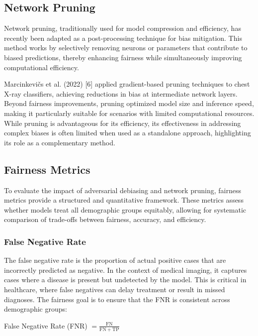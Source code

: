 \documentclass[11pt]{article}
\begin{document}
\subsection{Network Pruning}

Network pruning, traditionally used for model compression and efficiency, has recently been adapted as a post-processing technique for bias mitigation. This method works by selectively removing neurons or parameters that contribute to biased predictions, thereby enhancing fairness while simultaneously improving computational efficiency.

Marcinkevi\v{c}s et al. (2022) [6] applied gradient-based pruning techniques to chest X-ray classifiers, achieving reductions in bias at intermediate network layers. Beyond fairness improvements, pruning optimized model size and inference speed, making it particularly suitable for scenarios with limited computational resources. While pruning is advantageous for its efficiency, its effectiveness in addressing complex biases is often limited when used as a standalone approach, highlighting its role as a complementary method.

\subsection{Fairness Metrics}

To evaluate the impact of adversarial debiasing and network pruning, fairness metrics provide a structured and quantitative framework. These metrics assess whether models treat all demographic groups equitably, allowing for systematic comparison of trade-offs between fairness, accuracy, and efficiency.

\subsubsection{False Negative Rate}

The false negative rate is the proportion of actual positive cases that are incorrectly predicted as negative. In the context of medical imaging, it captures cases where a disease is present but undetected by the model. This is critical in healthcare, where false negatives can delay treatment or result in missed diagnoses. The fairness goal is to ensure that the FNR is consistent across demographic groups:

\medskip
\noindent\hfill
False Negative Rate (FNR) $=\displaystyle\frac{\mathrm{FN}}{\mathrm{FN}+\mathrm{TP}}$
\hfill\null
\medskip
\end{document}
